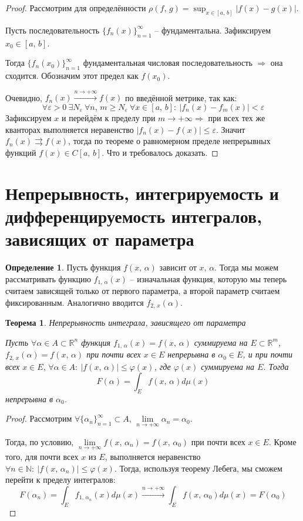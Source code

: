 \documentclass[a4paper,12pt]{article}
\renewcommand{\phi}{\ensuremath{\varphi}}
\renewcommand{\leq}{\ensuremath{\leqslant}}
\renewcommand{\geq}{\ensuremath{\geqslant}}
\theoremstyle{plain}
\newtheorem{theorem}{Теорема}[section]
\theoremstyle{definition}
\newtheorem{definition}{Определение}[section]
\theoremstyle{remark}
\begin{document}
\begin{proof}
	Рассмотрим для определённости $\rho(f,\,g) = \sup_{x \in [a,\,b]}|f(x) - g(x)|$.

	Пусть последовательность $\{f_n(x)\}_{n = 1}^\infty$ -- фундаментальна. Зафиксируем $x_0 \in [a,\,b]$.

	Тогда $\{f_n(x_0)\}_{n = 1}^\infty$ фундаментальная числовая последовательность $\Rightarrow$ она сходится. Обозначим этот предел как $f(x_0)$.

	Очевидно, $f_n(x) \stackrel{n \to +\infty}{\to} f(x)$ по введённой метрике, так как:
	\[\forall \varepsilon > 0 \: \exists N_\varepsilon \: \forall n,\,m \geq N_\varepsilon \: \forall x \in [a,\,b] :\: |f_n(x) - f_m(x)| < \varepsilon\]
	Зафиксируем $x$ и перейдём к пределу при $m \to +\infty \Rightarrow$ при всех тех же кванторах выполняется неравенство $|f_n(x) - f(x)| \leq \varepsilon$. Значит $f_n(x) \rightrightarrows f(x)$, тогда по теореме о равномерном пределе непрерывных функций $f(x) \in C[a,\,b]$. Что и требовалось доказать.
\end{proof}

\section{Непрерывность, интегрируемость и дифференцируемость интегралов, зависящих от параметра}
\begin{definition}
	Пусть функция $f(x,\,\alpha)$ зависит от $x,\, \alpha$. Тогда мы можем рассматривать функцию $f_{1,\,\alpha}(x)$ -- изначальная функция, которую мы теперь считаем зависящей только от первого параметра, а второй параметр считаем фиксированным. Аналогично вводится $f_{2,\,x}(\alpha)$.
\end{definition}

\begin{theorem}
	Непрерывность интеграла, зависящего от параметра

	Пусть $\forall \alpha \in A \subset \mathbb{R}^n$ функция $f_{1,\,\alpha}(x) = f(x,\,\alpha)$ суммируема на $E \subset \mathbb{R}^m$, $f_{2,\,x}(\alpha) = f(x,\,\alpha)$ при почти всех $x \in E$ непрерывна в $\alpha_0 \in E$, и при почти всех $x \in E,\, \forall \alpha \in A :\: |f(x,\,\alpha)| \leq \phi(x)$, где $\phi(x)$ суммируема на $E$. Тогда
	\[F(\alpha) = \int_E f(x,\, \alpha)d\mu(x)\]
	непрерывна в $\alpha_0$.
\end{theorem}

\begin{proof}
	Рассмотрим $\forall \{\alpha_n\}_{n = 1}^\infty \subset A,\, \lim\limits_{n\to +\infty}\alpha_n = \alpha_0$.

	Тогда, по условию, $\lim\limits_{n \to +\infty} f(x,\,\alpha_n) = f(x,\,\alpha_0)$ при почти всех $x \in E$. Кроме того, для почти всех $x$ из $E$, выполняется неравенство $\forall n \in \mathbb{N}:\: |f(x,\,\alpha_n)| \leq \phi(x)$. Тогда, используя теорему Лебега, мы сможем перейти к пределу интегралов:
	\[F(\alpha_n) = \int_E f_{1,\, \alpha_n}(x)d\mu(x) \stackrel{n \to +\infty}{\to} \int_E f(x,\,\alpha_0)d\mu(x) = F(\alpha_0)\]
\end{proof}
\end{document}
